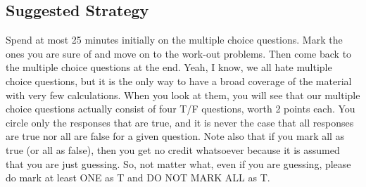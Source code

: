 \documentclass[letterpaper]{article}
\begin{document}
\begin{itemize}
\subsection*{Suggested Strategy}

Spend at most 25 minutes initially on the multiple choice questions. Mark the ones you are sure of and move on to the work-out problems. Then come back to the multiple choice questions at the end. Yeah, I know, we all hate multiple choice questions, but it is the only way to have a broad coverage of the material with very few calculations. When you look at them, you will see that our multiple choice questions actually consist of four T/F questions, worth 2 points each. You circle only the responses that are true, and it is never the case that all responses are true nor all are false for a given question. Note also that if you mark all as true (or all as false), then you get no credit whatsoever because it is assumed that you are just guessing. So, not matter what, even if you are guessing, please do mark at least ONE as T and DO NOT MARK ALL as T.


\end{itemize}
\end{document}
